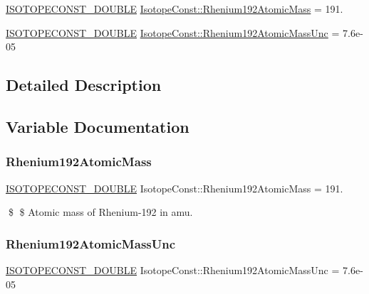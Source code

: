 \begin{DoxyCompactItemize}
\item 
\mbox{\hyperlink{group___isotope_const-_macros_ga8f45a7272ce02c0b4c65c44636ed719a}{I\+S\+O\+T\+O\+P\+E\+C\+O\+N\+S\+T\+\_\+\+D\+O\+U\+B\+LE}} \mbox{\hyperlink{group___isotope_const-_rhenium-_re192_ga9bdd3f8724cc6118f69116dbf9f26054}{Isotope\+Const\+::\+Rhenium192\+Atomic\+Mass}} = 191.
\item 
\mbox{\hyperlink{group___isotope_const-_macros_ga8f45a7272ce02c0b4c65c44636ed719a}{I\+S\+O\+T\+O\+P\+E\+C\+O\+N\+S\+T\+\_\+\+D\+O\+U\+B\+LE}} \mbox{\hyperlink{group___isotope_const-_rhenium-_re192_gaf53d9bf3c0fcac19b4243086115cc19d}{Isotope\+Const\+::\+Rhenium192\+Atomic\+Mass\+Unc}} = 7.\+6e-\/05
\end{DoxyCompactItemize}


\subsection{Detailed Description}


\subsection{Variable Documentation}
\mbox{\label{group___isotope_const-_rhenium-_re192_ga9bdd3f8724cc6118f69116dbf9f26054}} 
\subsubsection{\texorpdfstring{Rhenium192\+Atomic\+Mass}{Rhenium192AtomicMass}}
{\footnotesize\ttfamily \mbox{\hyperlink{group___isotope_const-_macros_ga8f45a7272ce02c0b4c65c44636ed719a}{I\+S\+O\+T\+O\+P\+E\+C\+O\+N\+S\+T\+\_\+\+D\+O\+U\+B\+LE}} Isotope\+Const\+::\+Rhenium192\+Atomic\+Mass = 191.}

\$ \$ Atomic mass of Rhenium-\/192 in amu. \mbox{\label{group___isotope_const-_rhenium-_re192_gaf53d9bf3c0fcac19b4243086115cc19d}} 
\subsubsection{\texorpdfstring{Rhenium192\+Atomic\+Mass\+Unc}{Rhenium192AtomicMassUnc}}
{\footnotesize\ttfamily \mbox{\hyperlink{group___isotope_const-_macros_ga8f45a7272ce02c0b4c65c44636ed719a}{I\+S\+O\+T\+O\+P\+E\+C\+O\+N\+S\+T\+\_\+\+D\+O\+U\+B\+LE}} Isotope\+Const\+::\+Rhenium192\+Atomic\+Mass\+Unc = 7.\+6e-\/05}

